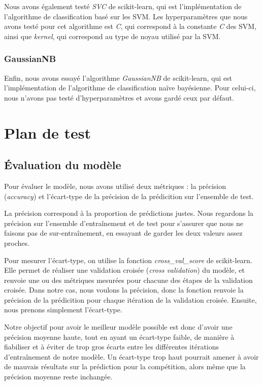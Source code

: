 \documentclass[a4paper]{article}
\begin{document}
    Nous avons également testé {\it SVC} de scikit-learn, qui est l'implémentation de l'algorithme de classification basé sur les SVM.
    Les hyperparamètres que nous avons testé pour cet algorithme est {\it C}, qui correspond à la constante {\it C}
    des SVM, ainsi que {\it kernel}, qui correspond au type de noyau utilisé par la SVM.

    \subsubsection{GaussianNB}

    Enfin, nous avons essayé l'algorithme {\it GaussianNB} de scikit-learn, qui est l'implémentation de l'algorithme de classification naïve bayésienne.
    Pour celui-ci, nous n'avons pas testé d'hyperparamètres et avons gardé ceux par défaut.


    \section{Plan de test}

    \subsection{Évaluation du modèle}

    Pour évaluer le modèle, nous avons utilisé deux métriques : la précision ({\it accuracy}) et l'écart-type de la précision de la prédicition sur l'ensemble de test.

    La précision correspond à la proportion de prédictions justes. Nous regardons la précision sur l'ensemble d'entraînement et
    de test pour s'assurer que nous ne faisons pas de sur-entraînement, en essayant de garder les deux valeurs assez proches.

    Pour mesurer l'écart-type, on utilise la fonction {\it cross\_val\_score} de scikit-learn. Elle permet de réaliser une
    validation croisée ({\it cross validation}) du modèle, et renvoie une ou des métriques mesurées pour chacune des étapes de
    la validation croisée. Dans notre cas, nous voulons la précision, donc la fonction renvoie la précision de la prédicition
    pour chaque itération de la validation croisée.
    Ensuite, nous prenons simplement l'écart-type.

    Notre objectif pour avoir le meilleur modèle possible est donc d'avoir une précision moyenne haute, tout en ayant un écart-type faible,
    de manière à fiabiliser et à éviter de trop gros écarts entre les différentes itérations d'entraînement de notre modèle.
    Un écart-type trop haut pourrait amener à avoir de mauvais résultats sur la prédiction pour la compétition, alors même que la
    précision moyenne reste inchangée.
\end{document}
